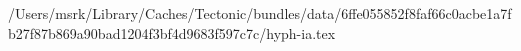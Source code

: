 /Users/msrk/Library/Caches/Tectonic/bundles/data/6ffe055852f8faf66c0acbe1a7fb27f87b869a90bad1204f3bf4d9683f597c7c/hyph-ia.tex
